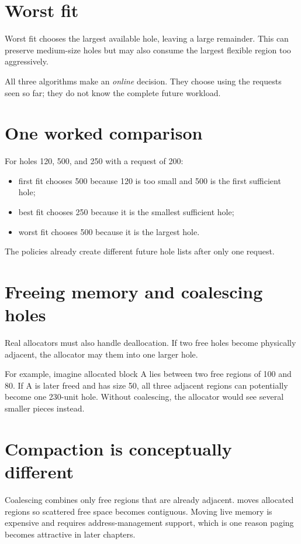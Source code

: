 \section{Worst fit}
Worst fit chooses the largest available hole, leaving a large remainder. This can preserve medium-size holes but may also consume the largest flexible region too aggressively.

\begin{keyidea}
All three algorithms make an \emph{online} decision. They choose using the requests seen so far; they do not know the complete future workload.
\end{keyidea}

\section{One worked comparison}
For holes 120, 500, and 250 with a request of 200:
\begin{itemize}
  \item first fit chooses 500 because 120 is too small and 500 is the first sufficient hole;
  \item best fit chooses 250 because it is the smallest sufficient hole;
  \item worst fit chooses 500 because it is the largest hole.
\end{itemize}
The policies already create different future hole lists after only one request.

\section{Freeing memory and coalescing holes}
Real allocators must also handle deallocation. If two free holes become physically adjacent, the allocator may  them into one larger hole.

For example, imagine allocated block A lies between two free regions of 100 and 80. If A is later freed and has size 50, all three adjacent regions can potentially become one 230-unit hole. Without coalescing, the allocator would see several smaller pieces instead.

\section{Compaction is conceptually different}
Coalescing combines only free regions that are already adjacent.  moves allocated regions so scattered free space becomes contiguous. Moving live memory is expensive and requires address-management support, which is one reason paging becomes attractive in later chapters.

